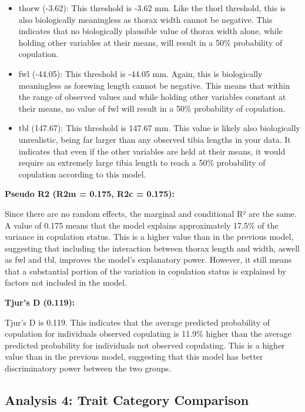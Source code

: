\documentclass[
]{article}
\begin{document}
\begin{itemize}
\item
  thorw (-3.62): This threshold is -3.62 mm. Like the thorl threshold,
  this is also biologically meaningless as thorax width cannot be
  negative. This indicates that no biologically plausible value of
  thorax width alone, while holding other variables at their means, will
  result in a 50\% probability of copulation.
\item
  fwl (-44.05): This threshold is -44.05 mm. Again, this is biologically
  meaningless as forewing length cannot be negative. This means that
  within the range of observed values and while holding other variables
  constant at their means, no value of fwl will result in a 50\%
  probability of copulation.
\item
  tbl (147.67): This threshold is 147.67 mm. This value is likely also
  biologically unrealistic, being far larger than any observed tibia
  lengths in your data. It indicates that even if the other variables
  are held at their means, it would require an extremely large tibia
  length to reach a 50\% probability of copulation according to this
  model.
\end{itemize}

\textbf{Pseudo R2 (R2m = 0.175, R2c = 0.175):}

Since there are no random effects, the marginal and conditional R² are
the same. A value of 0.175 means that the model explains approximately
17.5\% of the variance in copulation status. This is a higher value than
in the previous model, suggesting that including the interaction between
thorax length and width, aswell as fwl and tbl, improves the model's
explanatory power. However, it still means that a substantial portion of
the variation in copulation status is explained by factors not included
in the model.

\textbf{Tjur's D (0.119):}

Tjur's D is 0.119. This indicates that the average predicted probability
of copulation for individuals observed copulating is 11.9\% higher than
the average predicted probability for individuals not observed
copulating. This is a higher value than in the previous model,
suggesting that this model has better discriminatory power between the
two groups.

\hypertarget{analysis-4-trait-category-comparison}{%
\subsection{Analysis 4: Trait Category
Comparison}\label{analysis-4-trait-category-comparison}}
\end{document}
